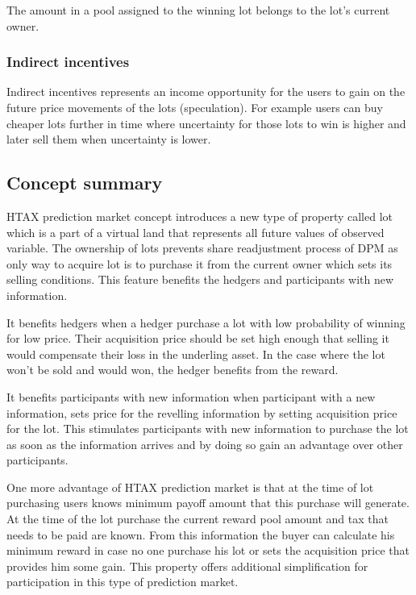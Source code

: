 \documentclass{article}
\begin{document}
	The amount in a pool assigned to the winning lot belongs to the lot's current owner. 
	
	\subsubsection*{Indirect incentives}
	
	Indirect incentives represents an income opportunity for the users to gain on the future price movements of the lots (speculation). For example users can buy cheaper lots further in time where uncertainty for those lots to win is higher and later sell them when uncertainty is lower.
	
	\subsection*{Concept summary}
	
	HTAX prediction market concept introduces a new type of property called lot which is a part of a virtual land that represents all future values of observed variable. The ownership of lots prevents share readjustment process of DPM as only way to acquire lot is to purchase it from the current owner which sets its selling conditions. This feature benefits the hedgers and participants with new information. 
	
	It benefits hedgers when a hedger purchase a lot with low probability of winning for low price. Their acquisition price should be set high enough that selling it would compensate their loss in the underling asset. In the case where the lot won't be sold and would won, the hedger benefits from the reward.     
	
	It benefits participants with new information when participant with a new information, sets price for the revelling information by setting acquisition price for the lot. This stimulates participants with new information to purchase the lot as soon as the information arrives and by doing so gain an advantage over other participants.
	
	One more advantage of HTAX prediction market is that at the time of lot purchasing users knows minimum payoff amount that this purchase will generate. At the time of the lot purchase the current reward pool amount and tax that needs to be paid are known. From this information the buyer can calculate his minimum reward in case no one purchase his lot or sets the acquisition price that provides him some gain. This property offers additional simplification for participation in this type of prediction market.     
	
\end{document}
